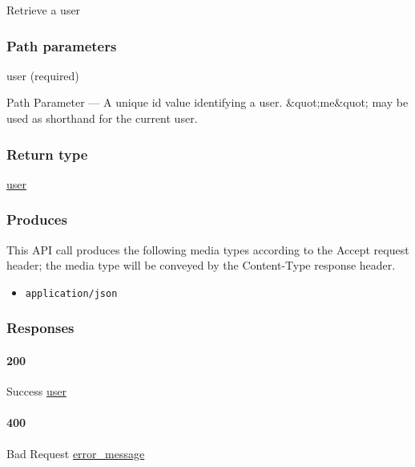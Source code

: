 Retrieve a user

\hypertarget{path-parameters-5}{%
\subsubsection{Path parameters}\label{path-parameters-5}}

user (required)

{Path Parameter} --- A unique id value identifying a user.
\&quot;me\&quot; may be used as shorthand for the current user.

\hypertarget{return-type-7}{%
\subsubsection{Return type}\label{return-type-7}}

\protect\hyperlink{user}{user}

\hypertarget{produces-10}{%
\subsubsection{Produces}\label{produces-10}}

This API call produces the following media types according to the
{Accept} request header; the media type will be conveyed by the
{Content-Type} response header.

\begin{itemize}
\tightlist
\item
  \texttt{application/json}
\end{itemize}

\hypertarget{responses-10}{%
\subsubsection{Responses}\label{responses-10}}

\hypertarget{section-32}{%
\paragraph{200}\label{section-32}}

Success \protect\hyperlink{user}{user}

\hypertarget{section-33}{%
\paragraph{400}\label{section-33}}

Bad Request \protect\hyperlink{error_message}{error\_message}

